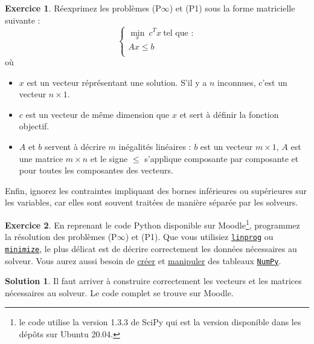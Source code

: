 \documentclass[a4paper,francais]{article}
\theoremstyle{definition}
\newtheorem{exercice}{Exercice}[section]
\newtheorem*{solution}{Solution}
\begin{document}
\begin{exercice}
  Réexprimez les problèmes (P$\infty$) et (P1)
  sous la forme matricielle suivante :
  \[
  \left\{
  \begin{array}{c}
    \min_x \ c^T x \ \text{tel que :} \\
    Ax \leq b \\
  \end{array}
  \right. 
  \]
  où 
\begin{itemize}
\item $x$ est un vecteur réprésentant une solution. S'il y a $n$ inconnues, c'est un vecteur $n \times 1$.
\item $c$ est un vecteur de même dimension que $x$ et sert à définir la fonction objectif.
\item $A$ et $b$ servent à décrire $m$ inégalités linéaires : $b$ est un vecteur $m \times 1$,
  $A$ est une matrice $m \times n$ et le signe $\leq$ s'applique composante par composante et pour
  toutes les composantes des vecteurs.
\end{itemize}
Enfin, ignorez les contraintes impliquant des bornes inférieures ou supérieures sur les variables,
car elles sont souvent traitées de manière séparée par les solveurs. 
\end{exercice}

\begin{exercice}
  En reprenant le code Python disponible sur Moodle\footnote{
    le code utilise la version 1.3.3 de SciPy qui est la version
    disponible dans les dépôts sur Ubuntu 20.04.},
  programmez la résolution des problèmes (P$\infty$) et (P1). 
  Que vous utilisiez 
  \href{https://docs.scipy.org/doc/scipy-1.3.3/reference/generated/scipy.optimize.linprog.html#scipy.optimize.linprog}{\texttt{linprog}} ou
  \href{https://docs.scipy.org/doc/scipy-1.3.3/reference/generated/scipy.optimize.minimize.html}{\texttt{minimize}},
  le plus délicat est de décrire correctement les données nécessaires au solveur.
  Vous aurez aussi besoin de
  \href{https://docs.scipy.org/doc/numpy/reference/routines.array-creation.html}{créer} et
  \href{https://docs.scipy.org/doc/numpy/reference/routines.array-manipulation.html}{manipuler} des
  tableaux
  \href{https://numpy.org/doc/stable/contents.html#numpy-docs-mainpage}{\texttt{NumPy}}. 
\end{exercice}

\begin{solution}
  Il faut arriver à construire correctement les vecteurs et les matrices nécessaires
  au solveur.
  Le code complet se trouve sur Moodle.  
\end{solution}
\end{document}

